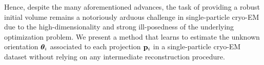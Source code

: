 Hence, despite the many aforementioned advances, the task of providing a robust initial volume remains a notoriously arduous challenge in single-particle cryo-EM due to the high-dimensionality and strong ill-posedness of the underlying optimization problem.
We present a method that learns to estimate the unknown orientation ${\boldsymbol{\theta}}_i$ associated to each projection $\mathbf{p}_i$ in a single-particle cryo-EM dataset without relying on any intermediate reconstruction procedure.

